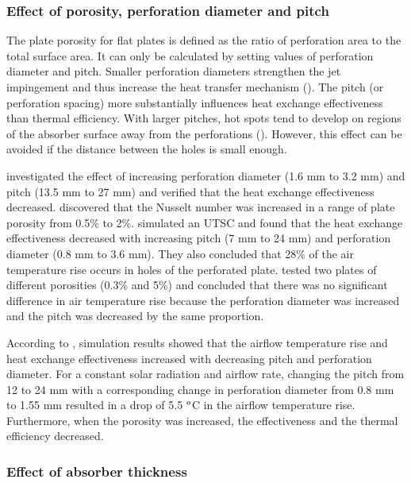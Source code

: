\subsubsection{Effect of porosity, perforation diameter and pitch} 

The plate porosity for flat plates is defined as the ratio of perforation area to the total surface area. It can only be calculated by setting values of perforation diameter and pitch. Smaller perforation diameters strengthen the jet impingement and thus increase the heat transfer mechanism (\citet{Li2016}). The pitch (or perforation spacing) more substantially influences heat exchange effectiveness than thermal efficiency. With larger pitches, hot spots tend to develop on regions of the absorber surface away from the perforations (\citet{Arulanandam1999}). However, this effect can be avoided if the distance between the holes is small enough.

\citet{Kutscher1994} investigated the effect of increasing perforation diameter (1.6 mm to 3.2 mm) and pitch (13.5 mm to 27 mm) and verified that the heat exchange effectiveness decreased. \citet{Arulanandam1999} discovered that the Nusselt number was increased in a range of plate porosity from 0.5\% to 2\%. \citet{Decker2001} simulated an UTSC and found that the heat exchange effectiveness decreased with increasing pitch (7 mm to 24 mm) and perforation diameter (0.8 mm to 3.6 mm). They also concluded that 28\% of the air temperature rise occurs in holes of the perforated plate. \citet{Gawlik2005} tested two plates of different porosities (0.3\% and 5\%) and concluded that there was no significant difference in air temperature rise because the perforation diameter was increased and the pitch was decreased by the same proportion. 

According to \citet{Leon2007}, simulation results showed that the airflow temperature rise and heat exchange effectiveness increased with decreasing pitch and perforation diameter. For a constant solar radiation and airflow rate, changing the pitch from 12 to 24 mm with a corresponding change in perforation diameter from 0.8 mm to 1.55 mm resulted in a drop of 5.5 $^{\rm o}$C in the airflow temperature rise. Furthermore, when the porosity was increased, the effectiveness and the thermal efficiency decreased.

\subsubsection{Effect of absorber thickness}   

